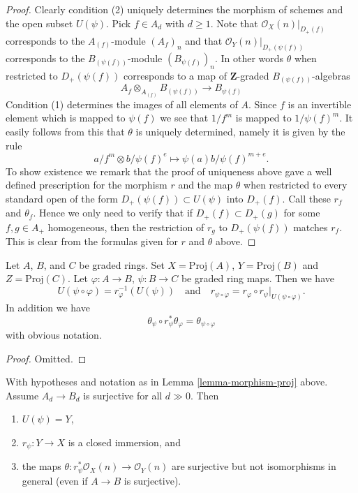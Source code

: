 \begin{proof}
Clearly condition (2) uniquely determines the morphism of schemes
and the open subset $U(\psi)$. Pick $f \in A_d$ with $d \geq 1$.
Note that
$\mathcal{O}_X(n)|_{D_{+}(f)}$ corresponds to the
$A_{(f)}$-module $(A_f)_n$ and that
$\mathcal{O}_Y(n)|_{D_{+}(\psi(f))}$ corresponds to the
$B_{(\psi(f))}$-module $(B_{\psi(f)})_n$. In other words $\theta$
when restricted to $D_{+}(\psi(f))$ corresponds to a map of
$\mathbf{Z}$-graded $B_{(\psi(f))}$-algebras
$$
A_f \otimes_{A_{(f)}} B_{(\psi(f))}
\longrightarrow
B_{\psi(f)}
$$
Condition (1) determines the images of all elements of $A$.
Since $f$ is an invertible element which is mapped to $\psi(f)$
we see that $1/f^m$ is mapped to $1/\psi(f)^m$. It easily follows
from this that $\theta$ is uniquely determined, namely it is
given by the rule
$$
a/f^m \otimes b/\psi(f)^e \longmapsto \psi(a)b/\psi(f)^{m + e}.
$$
To show existence we remark that the proof of uniqueness above gave
a well defined prescription for the morphism $r$ and the map $\theta$
when restricted to every standard open of the form
$D_{+}(\psi(f)) \subset U(\psi)$ into $D_{+}(f)$.
Call these $r_f$ and $\theta_f$.
Hence we only need to verify that if $D_{+}(f) \subset D_{+}(g)$
for some $f, g \in A_{+}$ homogeneous, then the restriction of
$r_g$ to $D_{+}(\psi(f))$ matches $r_f$. This is clear from the
formulas given for $r$ and $\theta$ above.
\end{proof}

\begin{lemma}
\label{lemma-morphism-proj-transitive}
Let $A$, $B$, and $C$ be graded rings.
Set $X = \text{Proj}(A)$, $Y = \text{Proj}(B)$ and $Z = \text{Proj}(C)$.
Let $\varphi : A \to B$, $\psi : B \to C$ be graded ring maps.
Then we have
$$
U(\psi \circ \varphi) = r_\varphi^{-1}(U(\psi))
\quad
\text{and}
\quad
r_{\psi \circ \varphi}
=
r_\varphi \circ r_\psi|_{U(\psi \circ \varphi)}.
$$
In addition we have
$$
\theta_\psi \circ r_\psi^*\theta_\varphi
=
\theta_{\psi \circ \varphi}
$$
with obvious notation.
\end{lemma}

\begin{proof}
Omitted.
\end{proof}

\begin{lemma}
\label{lemma-surjective-graded-rings-map-proj}
With hypotheses and notation as in Lemma \ref{lemma-morphism-proj} above.
Assume $A_d \to B_d$ is surjective for all $d \gg 0$. Then
\begin{enumerate}
\item $U(\psi) = Y$,
\item $r_\psi : Y \to X$ is a closed immersion, and
\item the maps $\theta : r_\psi^*\mathcal{O}_X(n) \to \mathcal{O}_Y(n)$
are surjective but not isomorphisms in general (even if $A \to B$ is
surjective).
\end{enumerate}
\end{lemma}

